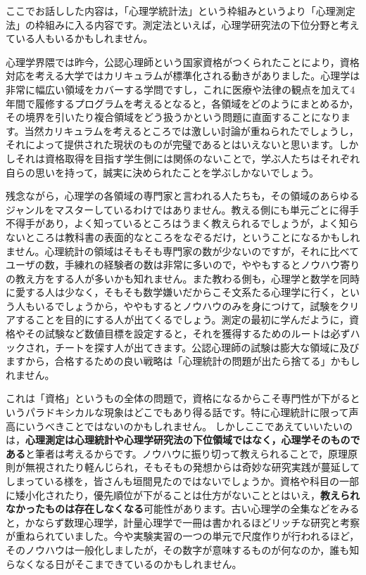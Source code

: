 \documentclass{ltjsbook}
\begin{document}
ここでお話しした内容は，「心理学統計法」という枠組みというより「心理測定法」の枠組みに入る内容です。測定法といえば，心理学研究法の下位分野と考えている人もいるかもしれません。

心理学界隈では昨今，公認心理師という国家資格がつくられたことにより，資格対応を考える大学ではカリキュラムが標準化される動きがありました。心理学は非常に幅広い領域をカバーする学問ですし，これに医療や法律の観点を加えて4年間で履修するプログラムを考えるとなると，各領域をどのようにまとめるか，その境界を引いたり複合領域をどう扱うかという問題に直面することになります。当然カリキュラムを考えるところでは激しい討論が重ねられたでしょうし，それによって提供された現状のものが完璧であるとはいえないと思います。しかしそれは資格取得を目指す学生側には関係のないことで，学ぶ人たちはそれぞれ自らの思いを持って，誠実に決められたことを学ぶしかないでしょう。

残念ながら，心理学の各領域の専門家と言われる人たちも，その領域のあらゆるジャンルをマスターしているわけではありません。教える側にも単元ごとに得手不得手があり，よく知っているところはうまく教えられるでしょうが，よく知らないところは教科書の表面的なところをなぞるだけ，ということになるかもしれません。心理統計の領域はそもそも専門家の数が少ないのですが，それに比べてユーザの数，手練れの経験者の数は非常に多いので，ややもするとノウハウ寄りの教え方をする人が多いかも知れません。また教わる側も，心理学と数学を同時に愛する人は少なく，そもそも数学嫌いだからこそ文系たる心理学に行く，という人もいるでしょうから，ややもするとノウハウのみを身につけて，試験をクリアすることを目的にする人が出てくるでしょう。測定の最初に学んだように，資格やその試験など数値目標を設定すると，それを獲得するためのルートは必ずハックされ，チートを探す人が出てきます。公認心理師の試験は膨大な領域に及びますから，合格するための良い戦略は「心理統計の問題が出たら捨てる」かもしれません。

これは「資格」というもの全体の問題で，資格になるからこそ専門性が下がるというパラドキシカルな現象はどこでもあり得る話です。特に心理統計に限って声高にいうべきことではないのかもしれません。
しかしここであえていいたいのは，\textbf{心理測定は心理統計や心理学研究法の下位領域ではなく，心理学そのものである}と筆者は考えるからです。ノウハウに振り切って教えられることで，原理原則が無視されたり軽んじられ，そもそもの発想からは奇妙な研究実践が蔓延してしまっている様を，皆さんも垣間見たのではないでしょうか。資格や科目の一部に矮小化されたり，優先順位が下がることは仕方がないこととはいえ，\textbf{教えられなかったものは存在しなくなる}可能性があります。古い心理学の全集などをみると，かならず数理心理学，計量心理学で一冊は書かれるほどリッチな研究と考察が重ねられていました。今や実験実習の一つの単元で尺度作りが行われるほど，そのノウハウは一般化しましたが，その数字が意味するものが何なのか，誰も知らなくなる日がそこまできているのかもしれません。
\end{document}
